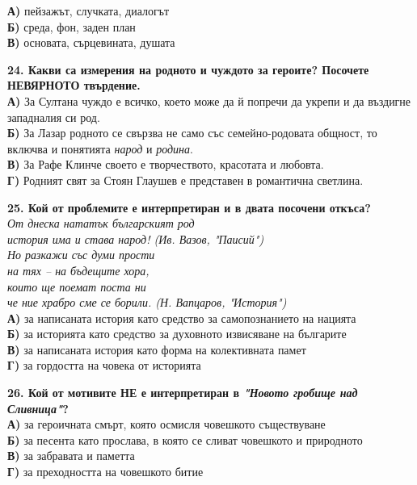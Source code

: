 \documentclass[12pt,a4paper]{article}
\begin{document}
\noindent
\textbf{А)} пейзажът, случката, диалогът \\
\textbf{Б)} среда, фон, заден план \\
\textbf{В)} основата, сърцевината, душата

\vspace{0.6cm}

\noindent
\textbf{24. Какви са измерения на родното и чуждото за героите? Посочете НЕВЯРНОТО твърдение.} \\
\noindent
\textbf{А)} За Султана чуждо е всичко, което може да й попречи да укрепи и да въздигне западналия си род. \\
\textbf{Б)} За Лазар родното се свързва не само със семейно-родовата общност, то включва и понятията \textit{народ} и \textit{родина}. \\
\textbf{В)} За Рафе Клинче своето е творчеството, красотата и любовта. \\
\textbf{Г)} Родният свят за Стоян Глаушев е представен в романтична светлина.

\vspace{0.6cm}

\noindent
\textbf{25. Кой от проблемите е интерпретиран и в двата посочени откъса?} \\[0.5em]
\noindent
\textit{От днеска нататък българският род} \\
\textit{история има и става народ! (Ив. Вазов, "Паисий")} \\[0.5em]
\textit{Но разкажи със думи прости} \\
\textit{на тях -- на бъдещите хора,} \\
\textit{които ще поемат поста ни} \\
\textit{че ние храбро сме се борили. (Н. Вапцаров, "История")} \\[0.6cm]
\noindent
\textbf{А)} за написаната история като средство за самопознанието на нацията \\
\textbf{Б)} за историята като средство за духовното извисяване на българите \\
\textbf{В)} за написаната история като форма на колективната памет \\
\textbf{Г)} за гордостта на човека от историята

\vspace{0.6cm}

\noindent
\textbf{26. Кой от мотивите НЕ е интерпретиран в \textit{"Новото гробище над Сливница"}?} \\[0.3em]
\noindent
\textbf{А)} за героичната смърт, която осмисля човешкото съществуване \\
\textbf{Б)} за песента като прослава, в която се сливат човешкото и природното \\
\textbf{В)} за забравата и паметта \\
\textbf{Г)} за преходността на човешкото битие
\end{document}
